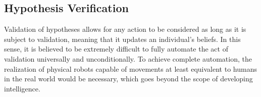 \documentclass{book}
\begin{document}




\subsection{Hypothesis Verification}
Validation of hypotheses allows for any action to be considered as long as it is subject to validation, meaning that it updates an individual's beliefs. In this sense, it is believed to be extremely difficult to fully automate the act of validation universally and unconditionally. To achieve complete automation, the realization of physical robots capable of movements at least equivalent to humans in the real world would be necessary, which goes beyond the scope of developing intelligence.
\end{document}
